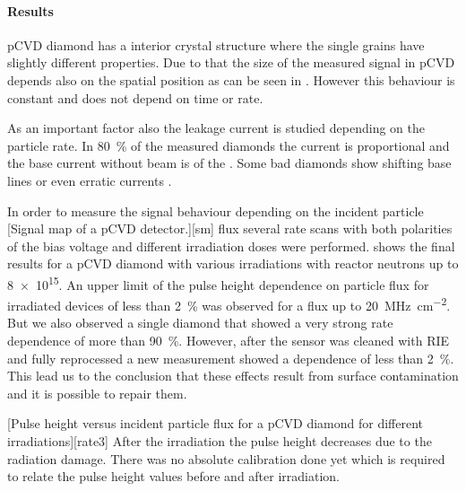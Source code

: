 \paragraph{Results}
\ac{pCVD} diamond has a interior crystal structure where the single grains have slightly different properties. Due to that the size of the measured signal in \ac{pCVD} depends also on the spatial position as can be seen in . However this behaviour is constant and does not depend on time or rate.\par
As an important factor also the leakage current is studied depending on the particle rate. In \SI{80}{\%} of the measured diamonds the current is proportional and the base current without beam is of the . Some bad diamonds show shifting base lines or even erratic currents \cite{erratic}.\par
In order to measure the signal behaviour depending on the incident particle 
[Signal map of a \ac{pCVD} detector.][sm]
flux several rate scans with both polarities of the bias voltage and different irradiation doses were performed.  shows the final results for a \ac{pCVD} diamond with various irradiations with reactor neutrons up to \SI{8e15}{\ncm}. An upper limit of the pulse height dependence on particle flux for irradiated devices of less than \SI{2}{\%} was observed for a flux up to \SI{20}{\mega\hertz\per cm^2}. But we also observed a single diamond that showed a very strong rate dependence of more than \SI{90}{\%}. However, after the sensor was cleaned with \ac{RIE} and fully reprocessed a new measurement showed a dependence of less than \SI{2}{\%}. This lead us to the conclusion that these effects result from surface contamination and it is possible to repair them.\par
{}[Pulse height versus incident particle flux for a \ac{pCVD} diamond for different irradiations][rate3]
After the irradiation the pulse height decreases due to the radiation damage. There was no absolute calibration done yet which is required to relate the pulse height values before and after irradiation.\par
